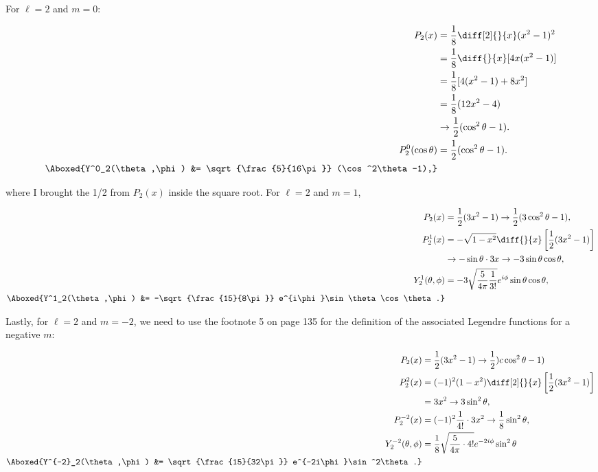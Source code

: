 \documentclass[titlepage]{article}
\begin{document}
    For $\ell=2$ and $m=0$:

    \begin{align}
      P_2(x) &= \frac{1}{8} \diff[2]{}{x}(x^2-1)^2 \\
             &= \frac{1}{8} \diff{}{x}[4x(x^2-1)] \\
             &= \frac{1}{8} [4(x^2-1) + 8x^2] \\
             &= \frac{1}{8} (12x^2 - 4) \\
             &\rightarrow \frac{1}{2}(\cos^2\theta - 1). \\
      P^0_2(\cos\theta) &= \frac{1}{2}(\cos^2\theta - 1). \\
      \Aboxed{Y^0_2(\theta,\phi) &= \sqrt{\frac{5}{16\pi}} (\cos^2\theta-1),}
    \end{align}

    where I brought the 1/2 from $P_2(x)$ inside the square root. For $\ell=2$ and $m=1$,

    \begin{align}
      P_2(x) &= \frac{1}{2}(3x^2 - 1) \rightarrow \frac{1}{2}(3\cos^2\theta - 1), \\
      P^1_2(x) &= - \sqrt{1 - x^2} \diff{}{x}\left[\frac{1}{2}(3x^2-1) \right] \\
             &\rightarrow -\sin\theta \cdot 3x \rightarrow -3\sin\theta\cos\theta, \\
      Y^1_2(\theta,\phi) &= -3 \sqrt{\frac{5}{4\pi} \frac{1}{3!}} e^{i\phi} \sin\theta\cos\theta, \\
      \Aboxed{Y^1_2(\theta,\phi) &= -\sqrt{\frac{15}{8\pi}} e^{i\phi}\sin\theta\cos\theta.}
    \end{align}

    Lastly, for $\ell=2$ and $m=-2$, we need to use the footnote 5 on page 135 for the definition of the associated Legendre functions for a negative $m$:

    \begin{align}
      P_2(x) &= \frac{1}{2} (3x^2 - 1) \rightarrow \frac{1}{2})c\cos^2\theta - 1) \\
      P^2_2(x) &= (-1)^2 (1-x^2) \diff[2]{}{x}\left[ \frac{1}{2}(3x^2 - 1) \right] \\
             &= 3x^2 \rightarrow 3\sin^2\theta, \\
      P^{-2}_2(x) &= (-1)^2 \frac{1}{4!} \cdot 3x^2 \rightarrow \frac{1}{8}\sin^2\theta, \\
      Y^{-2}_2(\theta,\phi) &= \frac{1}{8}\sqrt{\frac{5}{4\pi} \cdot 4!} e^{-2i\phi} \sin^2\theta \\
      \Aboxed{Y^{-2}_2(\theta,\phi) &= \sqrt{\frac{15}{32\pi}} e^{-2i\phi}\sin^2\theta.}      
    \end{align}
\end{document}
